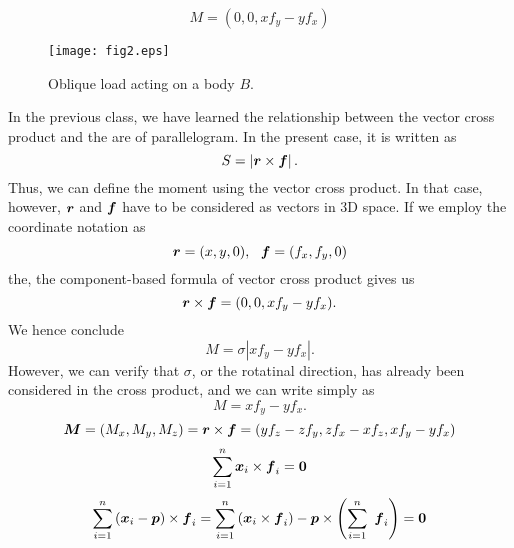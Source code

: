 \documentclass[10pt,a4j]{article}
\begin{document}
\begin{equation}
	M=(0,0,xf_y-yf_x)
	\label{eqn:}
\end{equation}
\begin{figure}[h]
	\begin{center}
	\texttt{[image: fig2.eps]} 
	\end{center}
	\caption{Oblique load acting on a body $B$.} 
	\label{fig:fig2}
\end{figure}

In the previous class, we have learned the relationship between the vector cross product 
and the are of parallelogram. In the present case, it is written as 
\begin{equation}
	S=\left| \mbox{\boldmath $r$} \times \mbox{\boldmath $f$} \right|.
	\label{eqn:}
\end{equation}
Thus, we can define the moment using the vector cross product. In that case, however, 
 $\mbox{\boldmath $r$}$ and $\mbox{\boldmath $f$}$ have to be considered as vectors in 3D space. 
If we employ the coordinate notation as 
\begin{equation}
	\fat{r}=(x,y,0), \ \ 
	\fat{f}=(f_x,f_y,0)
	\label{eqn:}
\end{equation}
the, the component-based formula of vector cross product gives us  
\begin{equation}
	\mbox{\boldmath $r$}\times \mbox{\boldmath $f$}=(0,0,xf_y-yf_x).
\end{equation}
We hence conclude
\begin{equation}
	M=\sigma \left| 
		xf_y-yf_x
	\right|.
\end{equation}
However, we can verify that $\sigma$, or the rotatinal direction, 
has already been considered in the cross product, and we can write simply as 
\begin{equation}
	M=xf_y-yf_x.
\end{equation}
\begin{equation}
	\mbox{\boldmath $M$}=(M_x, M_y, M_z)=
	\mbox{\boldmath $r$}\times\mbox{\boldmath $f$}
	=
	\left(
		yf_z-zf_y
	,
		zf_x-xf_z
	,
		xf_y-yf_x
	\right)
	\label{eqn:}
\end{equation}
\begin{equation}
	\sum_{i=1}^n \mbox{\boldmath $x$}_i\times \mbox{\boldmath $f$}_i
	=
	\mbox{\boldmath $0$}
	\label{eqn:}
\end{equation}
\begin{equation}
	\sum_{i=1}^n \left(\mbox{\boldmath $x$}_i-\mbox{\boldmath $p$}\right) \times \mbox{\boldmath $f$}_i
	=
	\sum_{i=1}^n \left( \mbox{\boldmath $x$}_i\times \mbox{\boldmath $f$}_i  \right)
	- 
	\mbox{\boldmath $p$} \times \left(\sum_{i=1}^n \ \mbox{\boldmath $f$}_i \right)
	=\mbox{\boldmath $0$}
	\label{eqn:}
\end{equation}
\end{document}
